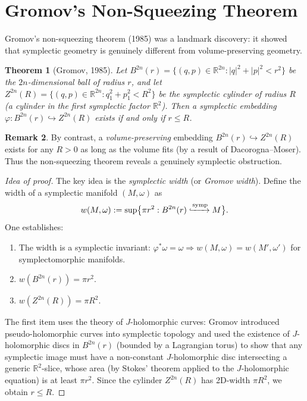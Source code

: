 \documentclass[12pt,a4paper]{amsart}
\newtheorem{theorem}{Theorem}[section]
\theoremstyle{definition}
\newtheorem{remark}[theorem]{Remark}
\begin{document}
\section{Gromov's Non-Squeezing Theorem}
\label{sec:gromov}

Gromov's non-squeezing theorem (1985) was a landmark discovery: it showed
that symplectic geometry is genuinely different from volume-preserving geometry.

\begin{theorem}[Gromov, 1985]\label{thm:gromov}
Let $B^{2n}(r) = \{(q,p) \in \mathbb{R}^{2n} : |q|^2 + |p|^2 < r^2\}$
be the $2n$-dimensional ball of radius $r$, and let
$Z^{2n}(R) = \{(q,p) \in \mathbb{R}^{2n} : q_1^2 + p_1^2 < R^2\}$
be the symplectic cylinder of radius $R$ (a cylinder in the first symplectic
factor $\mathbb{R}^2$).  Then a symplectic embedding
$\varphi: B^{2n}(r) \hookrightarrow Z^{2n}(R)$ exists if and only if
$r \leq R$.
\end{theorem}

\begin{remark}
By contrast, a \emph{volume-preserving} embedding $B^{2n}(r) \hookrightarrow
Z^{2n}(R)$ exists for any $R > 0$ as long as the volume fits (by a result of
Dacorogna--Moser).  Thus the non-squeezing theorem reveals a genuinely
symplectic obstruction.
\end{remark}

\begin{proof}[Idea of proof]
The key idea is the \emph{symplectic width} (or \emph{Gromov width}).  Define
the width of a symplectic manifold $(M, \omega)$ as
\[
  w(M, \omega) := \sup\bigl\{\pi r^2 : B^{2n}(r) \xhookrightarrow{\text{symp}} M\bigr\}.
\]
One establishes:
\begin{enumerate}[label=(\roman*)]
  \item The width is a symplectic invariant: $\varphi^* \omega = \omega
    \Rightarrow w(M, \omega) = w(M', \omega')$ for symplectomorphic manifolds.
  \item $w(B^{2n}(r)) = \pi r^2$.
  \item $w(Z^{2n}(R)) = \pi R^2$.
\end{enumerate}
The first item uses the theory of $J$-holomorphic curves: Gromov introduced
pseudo-holomorphic curves into symplectic topology and used the existence of
$J$-holomorphic discs in $B^{2n}(r)$ (bounded by a Lagrangian torus) to show
that any symplectic image must have a non-constant $J$-holomorphic disc
intersecting a generic $\mathbb{R}^2$-slice, whose area (by Stokes' theorem
applied to the $J$-holomorphic equation) is at least $\pi r^2$.  Since the
cylinder $Z^{2n}(R)$ has 2D-width $\pi R^2$, we obtain $r \leq R$.
\end{proof}
\end{document}
